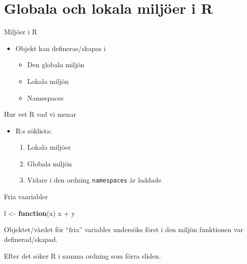\documentclass[
  11pt,
  ignorenonframetext,
]{beamer}
\newenvironment{Shaded}{\begin{snugshade}}{\end{snugshade}}
\newcommand{\ControlFlowTok}[1]{\textcolor[rgb]{0.13,0.29,0.53}{\textbf{#1}}}
\newcommand{\NormalTok}[1]{#1}
\newcommand{\OtherTok}[1]{\textcolor[rgb]{0.56,0.35,0.01}{#1}}
\newcommand{\SpecialCharTok}[1]{\textcolor[rgb]{0.00,0.00,0.00}{#1}}
\providecommand{\tightlist}{%
  \setlength{\itemsep}{0pt}\setlength{\parskip}{0pt}}
\begin{document}
\hypertarget{globala-och-lokala-miljuxf6er-i-r}{%
\section{Globala och lokala miljöer i
R}\label{globala-och-lokala-miljuxf6er-i-r}}

\begin{frame}{Miljöer i R}
\protect\hypertarget{miljuxf6er-i-r}{}
\begin{itemize}
\tightlist
\item
  Objekt kan defineras/skapas i

  \begin{itemize}
  \tightlist
  \item
    Den globala miljön
  \item
    Lokala miljön
  \item
    Namespaces
  \end{itemize}
\end{itemize}
\end{frame}

\begin{frame}{Hur vet R vad vi menar}
\protect\hypertarget{hur-vet-r-vad-vi-menar}{}
\begin{itemize}
\tightlist
\item
  R:s söklista:

  \begin{enumerate}
  \tightlist
  \item
    Lokala miljöer
  \item
    Globala miljön
  \item
    Vidare i den ordning \texttt{namespaces} är laddade
  \end{enumerate}
\end{itemize}
\end{frame}

\begin{frame}[fragile]{Fria vaariabler}
\protect\hypertarget{fria-vaariabler}{}
\begin{Shaded}
\begin{Highlighting}[]
\NormalTok{f }\OtherTok{\textless{}{-}} \ControlFlowTok{function}\NormalTok{(x) x }\SpecialCharTok{+}\NormalTok{ y}
\end{Highlighting}
\end{Shaded}

Objektet/värdet för ``fria'' variabler undersöks först i den miljön
funktionen var definerad/skapad.

Efter det söker R i samma ordning som förra sliden.
\end{frame}
\end{document}
